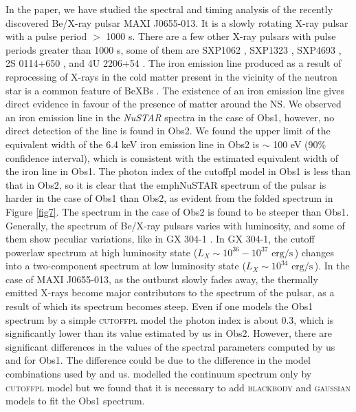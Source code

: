 \documentclass[12pt,a4paper,fleqn,usenatbib]{mnras}
\newcommand{\unilum}{$\text{erg}/\text{s}\,$}
\begin{document}
In the paper, we have studied the spectral and timing analysis of the recently discovered Be/X-ray pulsar MAXI J0655-013. It is a slowly rotating X-ray pulsar with a pulse period $>$ 1000 s. There are a few other X-ray pulsars with pulse periods greater than 1000 s, some of them are SXP1062 \citep{2012MNRAS.420L..13H}, SXP1323 \citep{2000A&AS..147...75S}, SXP4693 \citep{2010ApJ...716.1217L}, 2S 0114+650 \citep{1999ApJ...513L..45L}, and 4U 2206+54 \citep{Reig2012}. The iron emission line produced as a result of reprocessing of X-rays in the cold matter present in the vicinity of the neutron star is a common feature of BeXBs \citep{2013A&A...551A...1R}. The existence of an iron emission line gives direct evidence in favour of the presence of matter around the NS. We observed an iron emission line in the \emph{NuSTAR} spectra in the case of Obs1, however, no direct detection of the line is found in Obs2. We found the upper limit of the equivalent width of the 6.4 keV iron emission line in Obs2 is $\sim$ 100 eV (90\% confidence interval), which is consistent with the estimated equivalent width of the iron line in Obs1. The photon index of the cutoffpl model in Obs1 is less than that in Obs2, so it is clear that the emphNuSTAR spectrum of the pulsar is harder in the case of Obs1 than Obs2, as evident from the folded spectrum in Figure \ref{fig7}. The spectrum in the case of Obs2 is found to be steeper than Obs1. Generally, the spectrum of Be/X-ray pulsars varies with luminosity, and some of them show peculiar variations, like in GX 304-1 \citep{2019MNRAS.483L.144T}. In GX 304-1, the cutoff powerlaw spectrum at high luminosity state ($L_{X}\sim10^{36}-10^{37}$ \unilum) changes into a two-component spectrum at low luminosity state ($L_{X}\sim10^{34}$ \unilum). In the case of MAXI J0655-013, as the outburst slowly fades away, the thermally emitted X-rays become major contributors to the spectrum of the pulsar, as a result of which its spectrum becomes steep. Even if one models the Obs1 spectrum by a simple \textsc{cutoffpl} model \citep{2022ATel15495....1S} the photon index is about 0.3, which is significantly lower than its value estimated by us in Obs2. However, there are significant differences in the values of the spectral parameters computed by us and \citep{2022ATel15495....1S} for Obs1. The difference could be due to the difference in the model combinations used by \cite{2022ATel15495....1S} and us. \cite{2022ATel15495....1S} modelled the continuum spectrum only by \textsc{cutoffpl} model but we found that it is necessary to add \textsc{blackbody} and \textsc{gaussian} models to fit the Obs1 spectrum. 
\end{document}
